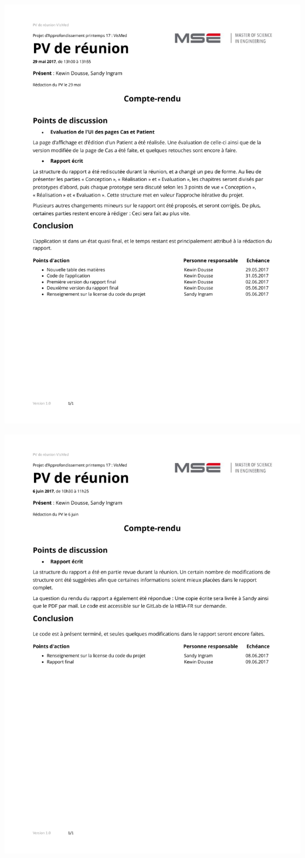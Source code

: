 \includegraphics[width=1\textwidth]{images/annexes/pvs/VisMed_PV_29_05_2017}

\includegraphics[width=1\textwidth]{images/annexes/pvs/VisMed_PV_06_06_2017}